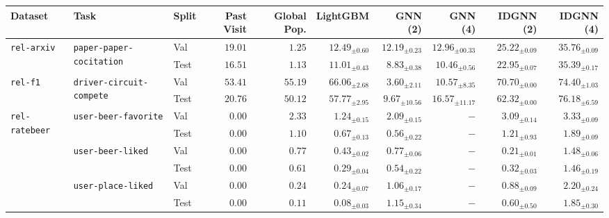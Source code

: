 \begin{tabular}{lllrrrrrrr}
\toprule
Dataset & Task & Split & Past Visit & Global Pop. & LightGBM & GNN (2) & GNN (4) & IDGNN (2) & IDGNN (4) \\
\midrule
\multirow[c]{2}{*}{\texttt{rel-arxiv}} & \multirow[c]{2}{*}{\texttt{paper-paper-cocitation}} & Val & $19.01$ & $1.25$ & $12.49_{\pm 0.60}$ & $12.19_{\pm 0.23}$ & $12.96_{\pm 00.33}$ & $25.22_{\pm 0.09}$ & $\bm{35.76}_{\pm 0.09}$ \\
 &  & Test & $16.51$ & $1.13$ & $11.01_{\pm 0.43}$ & $8.83_{\pm 0.38}$ & $10.46_{\pm 0.56}$ & $22.95_{\pm 0.07}$ & $\bm{35.39}_{\pm 0.17}$ \\
\cmidrule{1-10} \cmidrule{2-10}
\multirow[c]{2}{*}{\texttt{rel-f1}} & \multirow[c]{2}{*}{\texttt{driver-circuit-compete}} & Val & $53.41$ & $55.19$ & $66.06_{\pm 2.68}$ & $3.60_{\pm 2.11}$ & $10.57_{\pm 8.35}$ & $70.70_{\pm 0.00}$ & $\bm{74.40}_{\pm 1.03}$ \\
 &  & Test & $20.76$ & $50.12$ & $57.77_{\pm 2.95}$ & $9.67_{\pm 10.56}$ & $16.57_{\pm 11.17}$ & $62.32_{\pm 0.00}$ & $\bm{76.18}_{\pm 6.59}$ \\
\cmidrule{1-10} \cmidrule{2-10}
\multirow[c]{6}{*}{\texttt{rel-ratebeer}} & \multirow[c]{2}{*}{\texttt{user-beer-favorite}} & Val & $0.00$ & $2.33$ & $1.24_{\pm 0.15}$ & $2.09_{\pm 0.15}$ & $-$ & $3.09_{\pm 0.14}$ & $\bm{3.33}_{\pm 0.09}$ \\
 &  & Test & $0.00$ & $1.10$ & $0.67_{\pm 0.13}$ & $0.56_{\pm 0.22}$ & $-$ & $1.21_{\pm 0.93}$ & $\bm{1.89}_{\pm 0.09}$ \\
\cmidrule{2-10}
 & \multirow[c]{2}{*}{\texttt{user-beer-liked}} & Val & $0.00$ & $0.77$ & $0.43_{\pm 0.02}$ & $0.77_{\pm 0.06}$ & $-$ & $0.21_{\pm 0.01}$ & $1.48_{\pm 0.06}$ \\
 &  & Test & $0.00$ & $0.61$ & $0.29_{\pm 0.04}$ & $0.54_{\pm 0.22}$ & $-$ & $0.32_{\pm 0.03}$ & $1.46_{\pm 0.19}$ \\
\cmidrule{2-10}
 & \multirow[c]{2}{*}{\texttt{user-place-liked}} & Val & $0.00$ & $0.24$ & $0.24_{\pm 0.07}$ & $1.06_{\pm 0.17}$ & $-$ & $0.88_{\pm 0.09}$ & $2.20_{\pm 0.24}$ \\
 &  & Test & $0.00$ & $0.11$ & $0.08_{\pm 0.03}$ & $1.15_{\pm 0.34}$ & $-$ & $0.60_{\pm 0.50}$ & $1.85_{\pm 0.30}$ \\
\bottomrule
\end{tabular}
